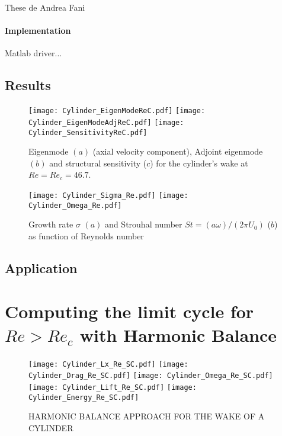 \documentclass{elsarticle}
\begin{document}
These de Andrea Fani



\paragraph{Implementation}

Matlab driver...


\subsection{Results}

\begin{figure}
\texttt{[image: Cylinder\_EigenModeReC.pdf]}
\texttt{[image: Cylinder\_EigenModeAdjReC.pdf]}
\texttt{[image: Cylinder\_SensitivityReC.pdf]}
\caption{Eigenmode $(a)$  (axial velocity component),  Adjoint eigenmode $(b)$ and structural sensitivity ($c$) for the cylinder's wake at $Re=Re_c = 46.7$.}
\label{fig:Eigenmode}
\end{figure}


\begin{figure}
\texttt{[image: Cylinder\_Sigma\_Re.pdf]}
\texttt{[image: Cylinder\_Omega\_Re.pdf]}
\caption{Growth rate $\sigma$ $(a)$  and Strouhal number $St = (a \omega)/(2\pi U_0)$ ($b$) as function of Reynolds number}
\label{fig:SigmaOmega}
\end{figure}


\subsection{Application}

\section{Computing the limit cycle for $Re>Re_c$ with Harmonic Balance}


\begin{figure}
\begin{center}
\texttt{[image: Cylinder\_Lx\_Re\_SC.pdf]}
\texttt{[image: Cylinder\_Drag\_Re\_SC.pdf]}
\texttt{[image: Cylinder\_Omega\_Re\_SC.pdf]}
\texttt{[image: Cylinder\_Lift\_Re\_SC.pdf]}
\texttt{[image: Cylinder\_Energy\_Re\_SC.pdf]}
\end{center}
\caption{HARMONIC BALANCE APPROACH FOR THE WAKE OF A CYLINDER}
\label{fig:HB}
\end{figure}
\end{document}
